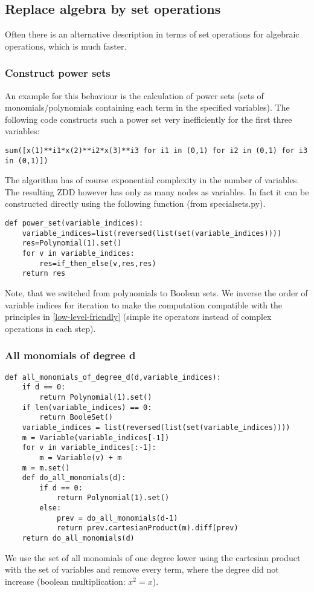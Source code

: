 \documentclass[]{article}
\newcommand{\ite}{{ite}\xspace}
\newcounter{thm}
\begin{document}
\subsection{Replace algebra by set operations}
Often there is an alternative description in terms of set operations for algebraic operations, which is much faster.

\subsubsection{Construct power sets}
An example for this behaviour is the calculation of power sets (sets of monomials/polynomials containing each term in the specified variables).
The following code constructs such a power set very inefficiently for the first three variables:
\begin{verbatim}
sum([x(1)**i1*x(2)**i2*x(3)**i3 for i1 in (0,1) for i2 in (0,1) for i3 in (0,1)])
\end{verbatim}
The algorithm has of course exponential complexity in the number of variables.
The resulting ZDD however has only as many nodes as variables.
In fact it can be constructed directly using the following function (from specialsets.py).
\begin{verbatim}
def power_set(variable_indices):
    variable_indices=list(reversed(list(set(variable_indices))))
    res=Polynomial(1).set()
    for v in variable_indices:
        res=if_then_else(v,res,res)
    return res
\end{verbatim}
Note, that we switched from polynomials to Boolean sets. We inverse the order of variable indices for iteration to make the computation compatible with the principles in \ref{low-level-friendly} (simple \ite operators instead of complex operations in each step).
\subsubsection{All monomials of degree d}
\begin{verbatim}
def all_monomials_of_degree_d(d,variable_indices):
    if d == 0:
        return Polynomial(1).set()
    if len(variable_indices) == 0:
        return BooleSet()
    variable_indices = list(reversed(list(set(variable_indices))))
    m = Variable(variable_indices[-1])
    for v in variable_indices[:-1]:
        m = Variable(v) + m
    m = m.set()
    def do_all_monomials(d):
        if d == 0:
            return Polynomial(1).set()
        else:
            prev = do_all_monomials(d-1)
            return prev.cartesianProduct(m).diff(prev)
    return do_all_monomials(d)
\end{verbatim}
We use the set of all monomials of one degree lower using the cartesian product with the set of variables and remove every term, where the degree did not increase (boolean multiplication: $x^2=x$).
\end{document}

